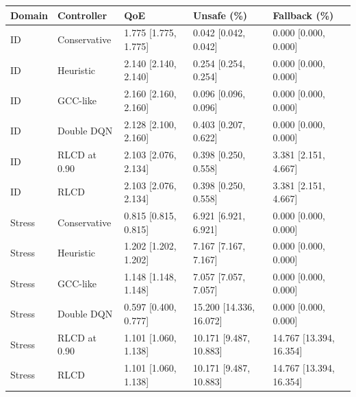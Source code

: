 \begin{tabular}{lllll}
\toprule
Domain & Controller & QoE & Unsafe (\%) & Fallback (\%) \\
\midrule
ID & Conservative & 1.775 [1.775, 1.775] & 0.042 [0.042, 0.042] & 0.000 [0.000, 0.000] \\
ID & Heuristic & 2.140 [2.140, 2.140] & 0.254 [0.254, 0.254] & 0.000 [0.000, 0.000] \\
ID & GCC-like & 2.160 [2.160, 2.160] & 0.096 [0.096, 0.096] & 0.000 [0.000, 0.000] \\
ID & Double DQN & 2.128 [2.100, 2.160] & 0.403 [0.207, 0.622] & 0.000 [0.000, 0.000] \\
ID & RLCD at 0.90 & 2.103 [2.076, 2.134] & 0.398 [0.250, 0.558] & 3.381 [2.151, 4.667] \\
ID & RLCD & 2.103 [2.076, 2.134] & 0.398 [0.250, 0.558] & 3.381 [2.151, 4.667] \\
Stress & Conservative & 0.815 [0.815, 0.815] & 6.921 [6.921, 6.921] & 0.000 [0.000, 0.000] \\
Stress & Heuristic & 1.202 [1.202, 1.202] & 7.167 [7.167, 7.167] & 0.000 [0.000, 0.000] \\
Stress & GCC-like & 1.148 [1.148, 1.148] & 7.057 [7.057, 7.057] & 0.000 [0.000, 0.000] \\
Stress & Double DQN & 0.597 [0.400, 0.777] & 15.200 [14.336, 16.072] & 0.000 [0.000, 0.000] \\
Stress & RLCD at 0.90 & 1.101 [1.060, 1.138] & 10.171 [9.487, 10.883] & 14.767 [13.394, 16.354] \\
Stress & RLCD & 1.101 [1.060, 1.138] & 10.171 [9.487, 10.883] & 14.767 [13.394, 16.354] \\
\bottomrule
\end{tabular}
